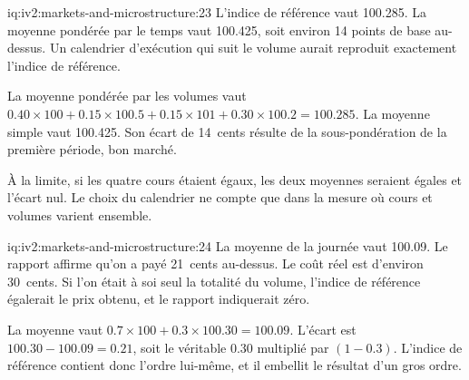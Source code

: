 \begin{solution}{iq:iv2:markets-and-microstructure:23}
L'indice de référence vaut 100.285. La moyenne pondérée par le temps vaut 100.425, soit environ 14 points de base au-dessus. Un calendrier d'exécution qui suit le volume aurait reproduit exactement l'indice de référence.

La moyenne pondérée par les volumes vaut $0.40 \times 100 + 0.15 \times 100.5 + 0.15 \times 101 + 0.30 \times 100.2 = 100.285$. La moyenne simple vaut 100.425. Son écart de 14~cents résulte de la sous-pondération de la première période, bon marché.

À la limite, si les quatre cours étaient égaux, les deux moyennes seraient égales et l'écart nul. Le choix du calendrier ne compte que dans la mesure où cours et volumes varient ensemble.

\end{solution}

\begin{solution}{iq:iv2:markets-and-microstructure:24}
La moyenne de la journée vaut 100.09. Le rapport affirme qu'on a payé 21~cents au-dessus. Le coût réel est d'environ 30~cents. Si l'on était à soi seul la totalité du volume, l'indice de référence égalerait le prix obtenu, et le rapport indiquerait zéro.

La moyenne vaut $0.7 \times 100 + 0.3 \times 100.30 = 100.09$. L'écart est $100.30 - 100.09 = 0.21$, soit le véritable 0.30 multiplié par $(1 - 0.3)$. L'indice de référence contient donc l'ordre lui-même, et il embellit le résultat d'un gros ordre.

\end{solution}

